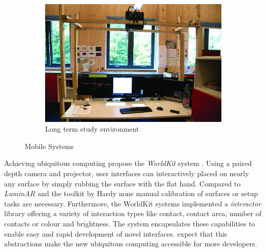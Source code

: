 \begin{figure}
        \quad %
        \begin{subfigure}[b]{0.3\textwidth}      
                \includegraphics[width=\textwidth]{images/relatedwork/hardy02.jpg}
                \caption{Long term study environment}
                \label{img:hardyLT}
        \end{subfigure}
        \caption{Mobile Systems}\label{fig:animals}
\end{figure}

Achieving ubiquitous computing \citeauthor{Xiao:2013dp} propose the \textit{WorldKit} system \cite{Xiao:2013dp}. Using a paired depth camera and projector, user interfaces can interactively placed on nearly any surface by simply rubbing the surface with the flat hand.
Compared to \textit{LuminAR} and the toolkit by Hardy none manual calibration of surfaces or setup tasks are necessary. Furthermore, the WorldKit systems implemented a \emph{interactor} library offering a variety of interaction types like contact, contact area, number of contacts or colour and brightness. The system encapsulates these capabilities to enable easy and rapid development of novel interfaces. \citeauthor{Xiao:2013dp} expect that this abstractions make the new ubiquitous computing accessible for more developers. 


